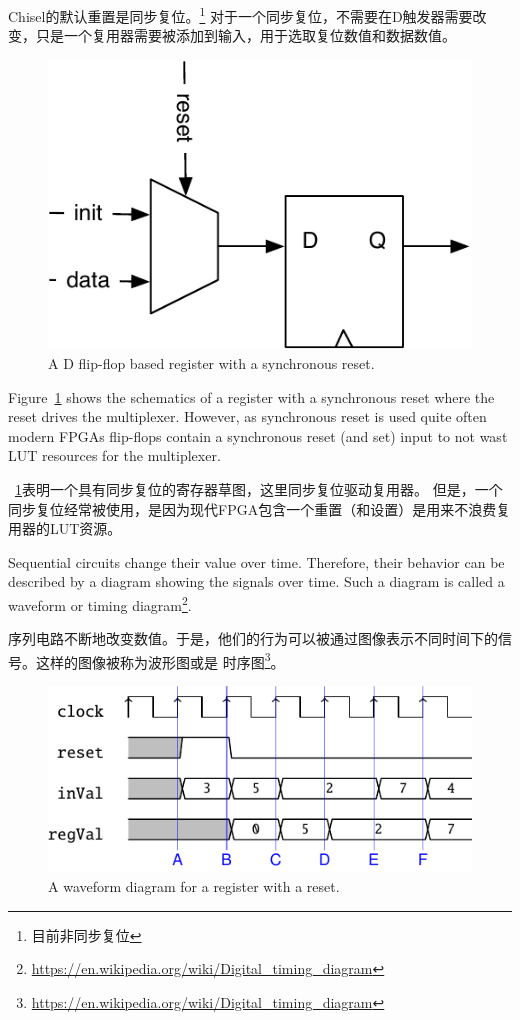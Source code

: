 \documentclass[%
    10pt,
    headinclude, footexclude,
    openright, %
    notitlepage,
    cleardoubleempty,
    headsepline,
    pointlessnumbers,
    bibtotoc, idxtotoc,
    ]{scrbook}
\newcommand{\scale}{0.7}
\newcommand{\todo}[1]{{\emph{TODO: #1}}}
\newcommand{\myref}[2]{\href{#1}{#2}}
\renewcommand{\myref}[2]{{#2}{\footnote{\url{#1}}}}
\renewcommand{\todo}[1]{}
\begin{document}
Chisel的默认重置是同步复位。\footnote{目前非同步复位}
对于一个同步复位，不需要在D触发器需要改变，只是一个复用器需要被添加到输入，用于选取复位数值和数据数值。


\begin{figure}
  \centering
  \includegraphics[scale=\scale]{figures/register-reset}
  \caption{A D flip-flop based register with a synchronous reset.}
  \label{fig:register-reset}
\end{figure}

Figure~\ref{fig:register-reset} shows the schematics of a register with a synchronous reset
where the reset drives the multiplexer. However, as synchronous reset is used quite often
modern FPGAs flip-flops contain a synchronous reset (and set) input to not wast LUT
resources for the multiplexer.

~\ref{fig:register-reset}表明一个具有同步复位的寄存器草图，这里同步复位驱动复用器。
但是，一个同步复位经常被使用，是因为现代FPGA包含一个重置（和设置）是用来不浪费复用器的LUT资源。

Sequential circuits change their value over time. Therefore, their behavior can be described
by a diagram showing the signals over time. Such a diagram is called a waveform or
\myref{https://en.wikipedia.org/wiki/Digital_timing_diagram}{timing diagram}.

序列电路不断地改变数值。于是，他们的行为可以被通过图像表示不同时间下的信号。这样的图像被称为波形图或是
\myref{https://en.wikipedia.org/wiki/Digital_timing_diagram}{时序图}。

\todo{from Luca: Do readers know about timing diagrams?}

\begin{figure}
  \centering
  \includegraphics[scale=1]{figures/reg_wave}
  \caption{A waveform diagram for a register with a reset.}
  \label{fig:register-wave}
\end{figure}
\end{document}
